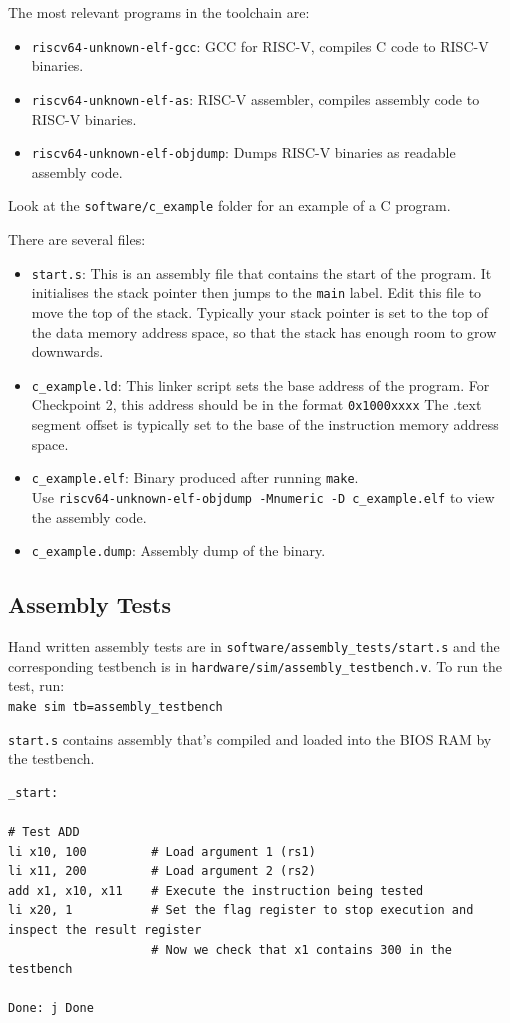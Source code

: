 \documentclass[11pt]{article}
\begin{document}
The most relevant programs in the toolchain are:
\begin{itemize}
    \item \verb|riscv64-unknown-elf-gcc|: GCC for RISC-V, compiles C code to RISC-V binaries.
    \item \verb|riscv64-unknown-elf-as|: RISC-V assembler, compiles assembly code to RISC-V binaries.
    \item \verb|riscv64-unknown-elf-objdump|: Dumps RISC-V binaries as readable assembly code.
\end{itemize}

Look at the \verb|software/c_example| folder for an example of a C program.

There are several files:
\begin{itemize}
    \item \verb|start.s|: This is an assembly file that contains the start of the program.
      It initialises the stack pointer then jumps to the \verb|main| label.
      Edit this file to move the top of the stack.
      Typically your stack pointer is set to the top of the data memory address space, so that the stack has enough room to grow downwards.

    \item \verb|c_example.ld|: This linker script sets the base address of the program.
      For Checkpoint 2, this address should be in the format \verb|0x1000xxxx|
      The .text segment offset is typically set to the base of the instruction memory address space.

    \item \verb|c_example.elf|: Binary produced after running \verb|make|.\\Use \verb|riscv64-unknown-elf-objdump -Mnumeric -D c_example.elf| to view the assembly code.
    \item \verb|c_example.dump|: Assembly dump of the binary.
\end{itemize}

\subsection{Assembly Tests}
\label{assembly_tests}
Hand written assembly tests are in \verb|software/assembly_tests/start.s| and the corresponding testbench is in \verb|hardware/sim/assembly_testbench.v|.
To run the test, run:\\
\verb|make sim tb=assembly_testbench|

\verb|start.s| contains assembly that's compiled and loaded into the BIOS RAM by the testbench.
\begin{verbatim}
_start:

# Test ADD
li x10, 100         # Load argument 1 (rs1)
li x11, 200         # Load argument 2 (rs2)
add x1, x10, x11    # Execute the instruction being tested
li x20, 1           # Set the flag register to stop execution and inspect the result register
                    # Now we check that x1 contains 300 in the testbench

Done: j Done
\end{verbatim}
\end{document}
